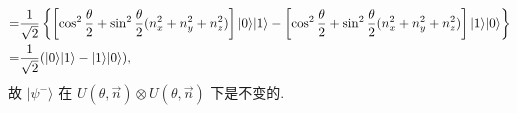 \documentclass{assignment}
\begin{document}
\begin{pf}
\begin{align}
        \notag=&\frac{1}{\sqrt{2}}\left\{\left[\cos^2\frac{\theta}{2}+\sin^2\frac{\theta}{2}(n_x^2+n_y^2+n_z^2)\right]\lvert 0\rangle\lvert 1\rangle-\left[\cos^2\frac{\theta}{2}+\sin^2\frac{\theta}{2}(n_x^2+n_y^2+n_z^2)\right]\lvert 1\rangle\lvert 0\rangle\right\}\\
        =&\frac{1}{\sqrt{2}}(\lvert 0\rangle\lvert 1\rangle-\lvert 1\rangle\lvert 0\rangle),
    \end{align}
    故 $\lvert\psi^-\rangle$ 在 $U(\theta,\vec{n})\otimes U(\theta,\vec{n})$ 下是不变的.
\end{pf}
\end{document}
